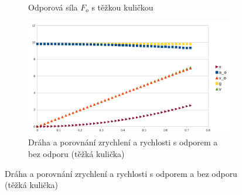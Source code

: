 \documentclass{fkssolpub}
\begin{document}
\begin{figure}[h!]
\begin{subfigure}[b]{0.5\textwidth}
		\caption{Odporová síla $F_o$ s těžkou kuličkou}
		\label{fig:c}
	\end{subfigure}
	\begin{subfigure}[b]{0.5\textwidth}
		\centering
		\includegraphics[width=\textwidth]{6-fig4.png}
		\caption{Dráha a porovnání zrychlení a rychlosti s odporem a bez odporu (těžká kulička)}
		\label{fig:d}
	\end{subfigure}
\end{figure}
\end{document}
